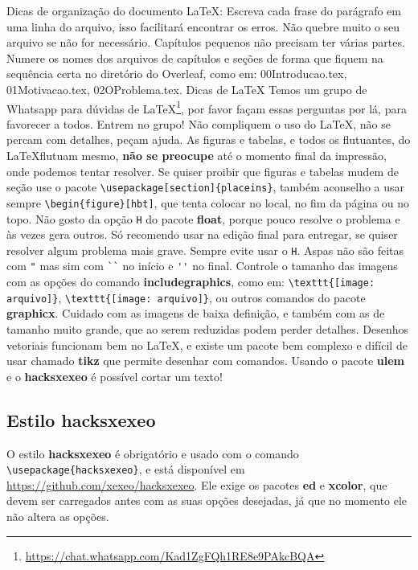 \documentclass{article}
\begin{document}
\begin{outline}
\1 Dicas de organização do documento \LaTeX:
\2 Escreva cada frase do parágrafo em uma linha do arquivo, isso facilitará encontrar os erros.
\2 Não quebre muito o seu arquivo se não for necessário. Capítulos pequenos não precisam ter várias partes.
\2 Numere os nomes dos arquivos de capítulos e seções de forma que fiquem na sequência certa no diretório do Overleaf, como em: 00Introducao.tex, 01Motivacao.tex, 02OProblema.tex.
\1 Dicas de \LaTeX
\2 Temos um grupo de Whatsapp para dúvidas de \LaTeX\footnote{\url{https://chat.whatsapp.com/Kad1ZgFQh1RE8e9PAkcBQA}}, por favor façam essas perguntas por lá, para favorecer a todos. Entrem no grupo!
\2 Não compliquem o uso do \LaTeX, não se percam com detalhes, peçam ajuda. 
\2 As figuras e tabelas, e todos os flutuantes, do \LaTeX flutuam mesmo, \textbf{não se preocupe} até o momento final da impressão, onde podemos tentar resolver. 
\2 Se quiser proibir que figuras e tabelas mudem de seção use o pacote \verb!\usepackage[section]{placeins}!, também aconselho a usar sempre \verb!\begin{figure}[hbt]!, que tenta colocar no local, no fim da página ou no topo. 
\3 Não gosto da opção \verb!H! do pacote \textbf{float}, porque pouco resolve o problema e às vezes gera outros. Só recomendo usar na edição final para entregar, se quiser resolver algum problema mais grave. Sempre evite usar o \verb!H!.
\2 Aspas não são feitas com \verb!"! mas sim com \verb!``! no início e \verb!''! no final.
\2 Controle o tamanho das imagens com as opções do comando \textbf{includegraphics}, como em: \verb!\texttt{[image: arquivo]}!, \verb!\texttt{[image: arquivo]}!, ou outros comandos do pacote \textbf{graphicx}.
\2 Cuidado com as imagens de baixa definição, e também com as de tamanho muito grande, que ao serem reduzidas podem perder detalhes. 
\2 Desenhos vetoriais funcionam bem no \LaTeX, e existe um pacote bem complexo e difícil de usar chamado \textbf{tikz} que permite desenhar com comandos. 
\2 Usando o pacote \textbf{ulem} e o \textbf{hacksxexeo} é possível cortar um texto! 
\end{outline}



\subsection{Estilo hacksxexeo}

O estilo \textbf{hacksxexeo} é obrigatório e usado com o comando \verb!\usepackage{hacksxexeo}!, e está disponível em \url{https://github.com/xexeo/hacksxexeo}. Ele exige os pacotes \textbf{ed} e \textbf{xcolor}, que devem ser carregados antes com as suas opções desejadas, já que no momento ele não altera as opções.
\end{document}
